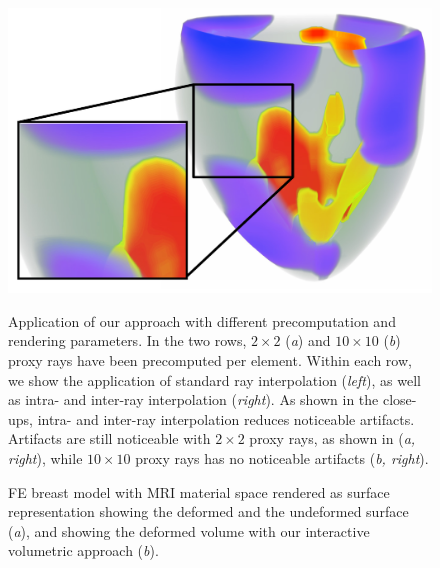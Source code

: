 \documentclass[review,journal]{vgtc}         %
\begin{document}
\begin{figure}[t]
{    \includegraphics[width=0.49\linewidth]{figures/heart-10-rr-ii-new-with-closeup.pdf}}
    \caption{Application of our approach with different precomputation and rendering parameters. In the two rows, $2 \times 2$ ({\it a}) and $10 \times 10$ ({\it b}) proxy rays have been precomputed per element. Within each row, we show the application of standard ray interpolation ({\it left}), as well as intra- and inter-ray interpolation ({\it right}). As shown in the close-ups, intra- and inter-ray interpolation reduces noticeable artifacts. Artifacts are still noticeable with $2 \times 2$ proxy rays, as shown in ({\it a, \it right}), while $10 \times 10$ proxy rays has no noticeable artifacts ({\it b, \it right}). }
    \label{fig:rayinterpolation}
\end{figure}

\begin{figure}[b]
    \centering 
    \caption{FE breast model with MRI material space rendered as surface representation showing the deformed and the undeformed surface ({\it a}), and showing the deformed volume with our interactive volumetric approach ({\it b}).}
    \label{fig:breast}
\end{figure}
\end{document}
